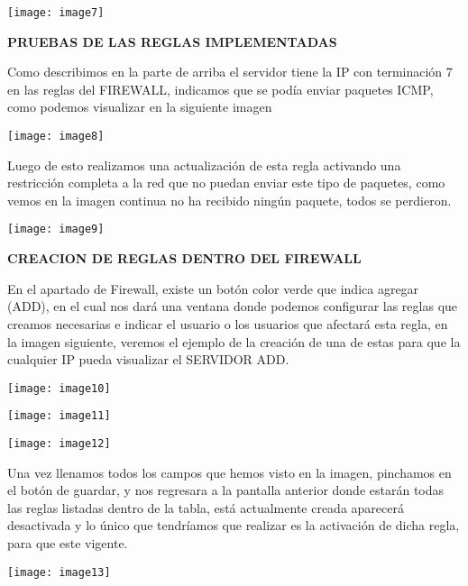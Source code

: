 \documentclass{book} %
\begin{document}
\noindent \texttt{[image: image7]}

\noindent \textbf{PRUEBAS DE LAS REGLAS IMPLEMENTADAS }

\noindent Como describimos en la parte de arriba el servidor tiene la IP con terminaci\'{o}n 7 en las reglas del FIREWALL, indicamos que se pod\'{i}a enviar paquetes ICMP, como podemos visualizar en la siguiente imagen

\noindent 

\noindent \texttt{[image: image8]}

\noindent Luego de esto realizamos una actualizaci\'{o}n de esta regla activando una restricci\'{o}n completa a la red que no puedan enviar este tipo de paquetes, como vemos en la imagen continua no ha recibido ning\'{u}n paquete, todos se perdieron.

\noindent \texttt{[image: image9]}

\noindent 

\noindent \textbf{CREACION DE REGLAS DENTRO DEL FIREWALL}

\noindent En el apartado de Firewall, existe un bot\'{o}n color verde que indica agregar (ADD), en el cual nos dar\'{a} una ventana donde podemos configurar las reglas que creamos necesarias e indicar el usuario o los usuarios que afectar\'{a} esta regla, en la imagen siguiente, veremos el ejemplo de la creaci\'{o}n de una de estas para que la cualquier IP pueda visualizar el SERVIDOR ADD.

\noindent \texttt{[image: image10]}

\noindent \texttt{[image: image11]}

\noindent \texttt{[image: image12]}

\noindent Una vez llenamos todos los campos que hemos visto en la imagen, pinchamos en el bot\'{o}n de guardar, y nos regresara a la pantalla anterior donde estar\'{a}n todas las reglas listadas dentro de la tabla, est\'{a} actualmente creada aparecer\'{a} desactivada y lo \'{u}nico que tendr\'{i}amos que realizar es la activaci\'{o}n de dicha regla, para que este vigente. 

\noindent \texttt{[image: image13]}

\noindent 
\end{document}
